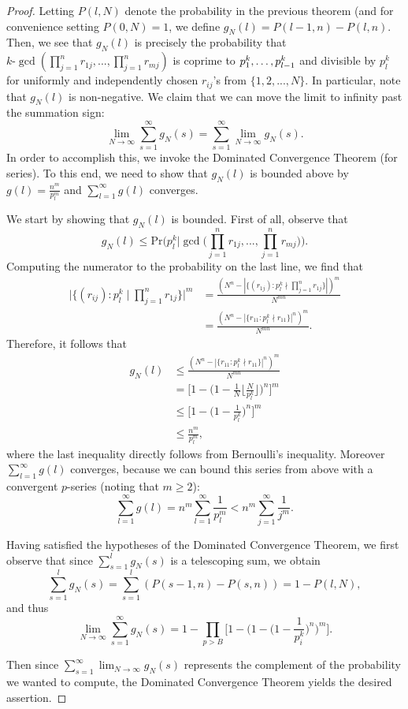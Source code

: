 \documentclass[10pt,a4paper]{article}
\theoremstyle{definition}
\theoremstyle{remark}
\begin{document}
\begin{proof}
	Letting $P(l, N)$ denote the probability in the previous theorem (and for convenience setting $P(0, N) = 1$, we define $g_N(l) = P(l-1, n) - P(l, n)$. Then, we see that $g_N(l)$ is precisely the probability that $k\text{-}\gcd(\prod_{j=1}^n r_{1j}, ... , \prod_{j=1}^n r_{mj})$ is coprime to $p^k_1, \mathellipsis, p^k_{l-1}$ and divisible by $p^k_l$ for uniformly and independently chosen $r_{ij}$'s from $\{1, 2, ..., N\}$. In particular, note that $g_N(l)$ is non-negative. We claim that we can move the limit to infinity past the summation sign:
	$$\lim_{N \to \infty} \sum_{s=1}^{\infty} g_N(s) = \sum_{s=1}^{\infty} \lim_{N \to \infty} g_N(s).$$
	In order to accomplish this, we invoke the Dominated Convergence Theorem (for series). To this end, we need to show that $g_N(l)$ is bounded above by $g(l) = \frac{n^m}{p_{l}^{m}}$ and $\sum_{l=1}^{\infty} g(l)$ converges.
	
	We start by showing that $g_N(l)$ is bounded. First of all, observe that
	$$g_N(l) \leq \text{Pr}\Big(p_l^k \Big| \gcd\Big(\prod_{j=1}^n r_{1j}, ... , \prod_{j=1}^n r_{mj}\Big)\Big).$$
	Computing the numerator to the probability on the last line, we find that
	\begin{align*} 
		\Big|\{(r_{ij}) : p_l^k \mid \prod_{j=1}^n r_{1j}\}\Big|^m &= \frac{(N^n - |\{(r_{1j}) : p_l^k \nmid \prod_{j=1}^n r_{1j}\}|)^m}{N^{mn}}\\
		&= \frac{(N^n - |\{r_{11} : p_l^k \nmid r_{11}\}|^n)^m}{N^{mn}}. \end{align*}
	Therefore, it follows that
	\begin{align*} 
		g_N(l) &\leq \frac{(N^n - |\{r_{11} : p_l^k \nmid r_{11}\}|^n)^m}{N^{mn}}\\
		&= \Big[1 - \Big(1 - \frac{1}{N} \Big\lfloor \frac{N}{p_l^k}\Big\rfloor\Big)^n\Big]^m\\
		&\leq \Big[1 - \Big(1 - \frac{1}{p_l^k}\Big)^n\Big]^m\\
		&\leq \frac{n^m}{p_l^{m}},\end{align*}
	where the last inequality directly follows from Bernoulli's inequality. Moreover $\sum_{l=1}^{\infty} g(l)$ converges, because we can bound this series from above with a convergent $p$-series (noting that $m \geq 2$):
	$$\sum_{l=1}^{\infty} g(l) = n^m \sum_{l=1}^{\infty} \frac{1}{p_l^m} < n^m \sum_{j=1}^{\infty} \frac{1}{j^m}.$$
	
	Having satisfied the hypotheses of the Dominated Convergence Theorem, we first observe that since $\sum_{s=1}^l g_N(s)$ is a telescoping sum, we obtain
	$$\sum_{s=1}^l g_N(s) = \sum_{s=1}^l (P(s-1, n) - P(s, n)) = 1 - P(l, N),$$ 
	and thus
	$$\lim_{N \to \infty} \sum_{s=1}^{\infty} g_N(s) = 1 - \prod_{p > B} \Big[1 - \Big(1 - \Big(1 - \frac{1}{p^k_i}  \Big)^n\Big)^m\Big].$$
	
	\noindent Then since $\displaystyle \sum_{s=1}^{\infty} \lim_{N \to \infty} g_N(s)$ represents the complement of the probability we wanted to compute, the Dominated Convergence Theorem yields the desired assertion.
\end{proof}
\end{document}
